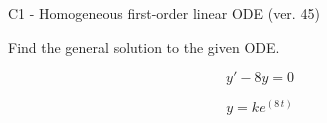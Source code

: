 \begin{exercise}
  \begin{exerciseTitle}C1 - Homogeneous first-order linear ODE (ver. 45)\end{exerciseTitle}
  \begin{exerciseStatement}
    
Find the general solution to the given ODE.

    
\[y'-8y=0\]

  \end{exerciseStatement}
  \begin{exerciseAnswer}
    
\[y= k e^{\left(8 \, t\right)}\]

  \end{exerciseAnswer}
\end{exercise}